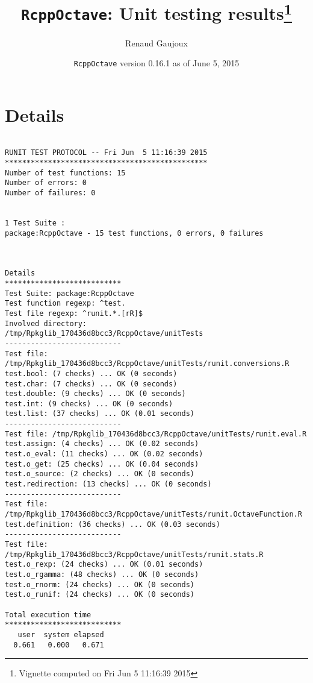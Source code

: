 \documentclass[10pt]{article}\usepackage[]{graphicx}\usepackage[]{color}
\author{Renaud Gaujoux}
\title{\texttt{RcppOctave}: Unit testing results\footnote{Vignette computed  on Fri Jun  5 11:16:39 2015}}
\date{\texttt{RcppOctave} version 0.16.1 as of June  5, 2015}
\begin{document}
\maketitle

\section{Details}
\begin{verbatim}

RUNIT TEST PROTOCOL -- Fri Jun  5 11:16:39 2015 
*********************************************** 
Number of test functions: 15 
Number of errors: 0 
Number of failures: 0 

 
1 Test Suite : 
package:RcppOctave - 15 test functions, 0 errors, 0 failures



Details 
*************************** 
Test Suite: package:RcppOctave 
Test function regexp: ^test. 
Test file regexp: ^runit.*.[rR]$ 
Involved directory: 
/tmp/Rpkglib_170436d8bcc3/RcppOctave/unitTests 
--------------------------- 
Test file: /tmp/Rpkglib_170436d8bcc3/RcppOctave/unitTests/runit.conversions.R 
test.bool: (7 checks) ... OK (0 seconds)
test.char: (7 checks) ... OK (0 seconds)
test.double: (9 checks) ... OK (0 seconds)
test.int: (9 checks) ... OK (0 seconds)
test.list: (37 checks) ... OK (0.01 seconds)
--------------------------- 
Test file: /tmp/Rpkglib_170436d8bcc3/RcppOctave/unitTests/runit.eval.R 
test.assign: (4 checks) ... OK (0.02 seconds)
test.o_eval: (11 checks) ... OK (0.02 seconds)
test.o_get: (25 checks) ... OK (0.04 seconds)
test.o_source: (2 checks) ... OK (0 seconds)
test.redirection: (13 checks) ... OK (0 seconds)
--------------------------- 
Test file: /tmp/Rpkglib_170436d8bcc3/RcppOctave/unitTests/runit.OctaveFunction.R 
test.definition: (36 checks) ... OK (0.03 seconds)
--------------------------- 
Test file: /tmp/Rpkglib_170436d8bcc3/RcppOctave/unitTests/runit.stats.R 
test.o_rexp: (24 checks) ... OK (0.01 seconds)
test.o_rgamma: (48 checks) ... OK (0 seconds)
test.o_rnorm: (24 checks) ... OK (0 seconds)
test.o_runif: (24 checks) ... OK (0 seconds)

Total execution time
***************************
   user  system elapsed 
  0.661   0.000   0.671 

\end{verbatim}
\end{document}
